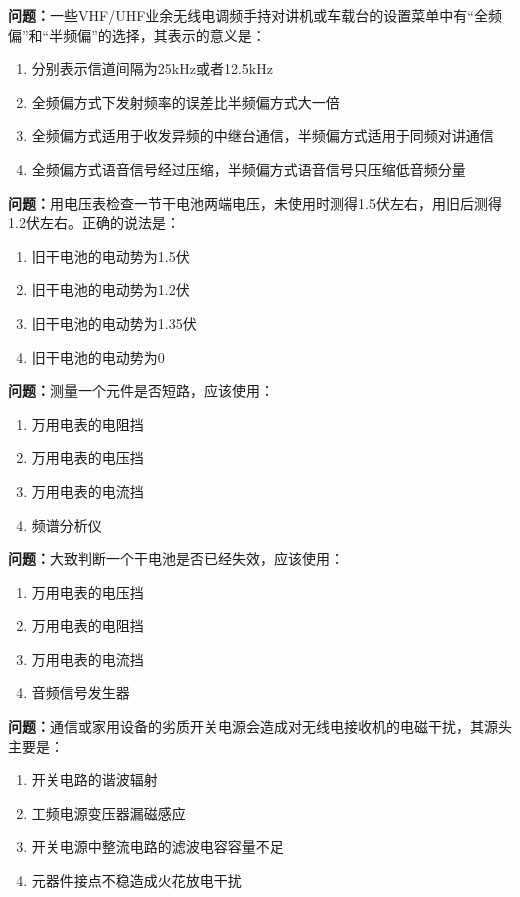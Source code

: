 \documentclass{ctexbook}
\begin{document}
\textbf{问题：}一些VHF/UHF业余无线电调频手持对讲机或车载台的设置菜单中有“全频偏”和“半频偏”的选择，其表示的意义是：
\begin{enumerate}[label=\Alph*), leftmargin=3em]
\item 分别表示信道间隔为25kHz或者12.5kHz
\item 全频偏方式下发射频率的误差比半频偏方式大一倍
\item 全频偏方式适用于收发异频的中继台通信，半频偏方式适用于同频对讲通信
\item 全频偏方式语音信号经过压缩，半频偏方式语音信号只压缩低音频分量
\end{enumerate}

\textbf{问题：}用电压表检查一节干电池两端电压，未使用时测得1.5伏左右，用旧后测得1.2伏左右。正确的说法是：
\begin{enumerate}[label=\Alph*), leftmargin=3em]
\item 旧干电池的电动势为1.5伏
\item 旧干电池的电动势为1.2伏
\item 旧干电池的电动势为1.35伏
\item 旧干电池的电动势为0
\end{enumerate}

\textbf{问题：}测量一个元件是否短路，应该使用：
\begin{enumerate}[label=\Alph*), leftmargin=3em]
\item 万用电表的电阻挡
\item 万用电表的电压挡
\item 万用电表的电流挡
\item 频谱分析仪
\end{enumerate}

\textbf{问题：}大致判断一个干电池是否已经失效，应该使用：
\begin{enumerate}[label=\Alph*), leftmargin=3em]
\item 万用电表的电压挡
\item 万用电表的电阻挡
\item 万用电表的电流挡
\item 音频信号发生器
\end{enumerate}

\textbf{问题：}通信或家用设备的劣质开关电源会造成对无线电接收机的电磁干扰，其源头主要是：
\begin{enumerate}[label=\Alph*), leftmargin=3em]
\item 开关电路的谐波辐射
\item 工频电源变压器漏磁感应
\item 开关电源中整流电路的滤波电容容量不足
\item 元器件接点不稳造成火花放电干扰
\end{enumerate}
\end{document}
